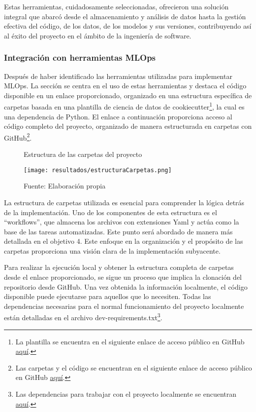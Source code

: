 \newpage

Estas herramientas, cuidadosamente seleccionadas, ofrecieron una solución integral que abarcó desde el almacenamiento y análisis de datos hasta la gestión efectiva del código, de los datos, de los modelos y sus versiones, contribuyendo así al éxito del proyecto en el ámbito de la ingeniería de software.

\subsubsection{Integración con herramientas MLOps}

Después de haber identificado las herramientas utilizadas para implementar MLOps. La sección se centra en el uso de estas herramientas y destaca el código disponible en un enlace proporcionado, organizado en una estructura específica de carpetas basada en una plantilla de ciencia de datos de cookiecutter\footnote{La plantilla se encuentra en el siguiente enlace de acceso público en GitHub \href{https://github.com/khuyentran1401/data-science-template/tree/dvc-pip}{aquí}.}, la cual es una dependencia de Python. El enlace a continuación proporciona acceso al código completo del proyecto, organizado de manera estructurada en carpetas con GitHub\footnote{Las carpetas y el código se encuentran en el siguiente enlace de acceso público en GitHub \href{https://github.com/juferoto/mlops_project}{aquí}.}.

\begin{figure}[h]
\centering
\caption{Estructura de las carpetas del proyecto}
\texttt{[image: resultados/estructuraCarpetas.png]}
\caption*{\footnotesize Fuente: Elaboración propia}
\label{fig:figuraEstructuraCarpetas}
\end{figure}

\newpage

La estructura de carpetas utilizada es esencial para comprender la lógica detrás de la implementación. Uno de los componentes de esta estructura es el ``workflows'', que almacena los archivos con extensiones Yaml y actúa como la base de las tareas automatizadas. Este punto será abordado de manera más detallada en el objetivo 4. Este enfoque en la organización y el propósito de las carpetas proporciona una visión clara de la implementación subyacente. \newline

Para realizar la ejecución local y obtener la estructura completa de carpetas desde el enlace proporcionado, se sigue un proceso que implica la clonación del repositorio desde GitHub. Una vez obtenida la información localmente, el código disponible puede ejecutarse para aquellos que lo necesiten. Todas las dependencias necesarias para el normal funcionamiento del proyecto localmente están detalladas en el archivo dev-requirements.txt\footnote{Las dependencias para trabajar con el proyecto localmente se encuentran \href{https://github.com/juferoto/mlops_project/blob/master/dev-requirements.txt}{aquí}.}. \newline

